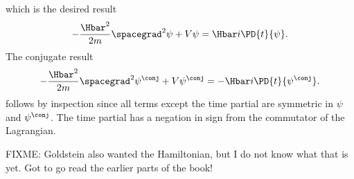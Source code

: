 %
which is the desired result
\begin{equation}\label{eqn:fieldLagrangian:620}
-\frac{\Hbar^2}{2 m} \spacegrad^2 \psi + V\psi = {\Hbar i}{} \PD{t}{\psi} .
\end{equation}
%
The conjugate result
%
%
\begin{equation}\label{eqn:fieldLag:schrod}
-\frac{\Hbar^2}{2 m} \spacegrad^2 \psi^\conj + V\psi^\conj = -{\Hbar i}{} \PD{t}{\psi^\conj} .
\end{equation}
%
follows by inspection since all terms except the time partial are symmetric in \(\psi\) and \(\psi^\conj\).  The time partial has a negation in sign from the commutator of the Lagrangian.

FIXME: Goldstein also wanted the Hamiltonian, but I do not know what that is yet.  Got to go read the earlier parts of the book!
%
